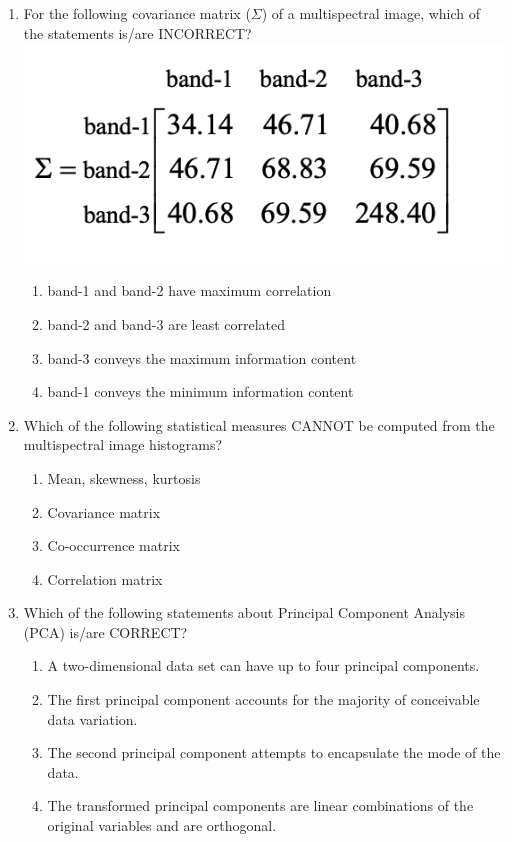 \documentclass[12pt]{article}
\begin{document}
\begin{enumerate}
\item For the following covariance matrix ($\Sigma$) of a multispectral image, which of the
statements is/are INCORRECT?\\

\includegraphics[scale=1]{Figs/LatexImage10.png} \\

\begin{enumerate}
   \item band-1 and band-2 have maximum correlation 
   \item band-2 and band-3 are least correlated 
   \item band-3 conveys the maximum information content 
   \item band-1 conveys the minimum information content 
\end{enumerate}

\item Which of the following statistical measures CANNOT be computed from the
multispectral image histograms?

\begin{enumerate}
    \item Mean, skewness, kurtosis 
   \item Covariance matrix 
   \item Co-occurrence matrix 
   \item Correlation matrix 
\end{enumerate}

\item Which of the following statements about Principal Component Analysis (PCA)
is/are CORRECT?

\begin{enumerate}
     \item A two-dimensional data set can have up to four principal components. 
   \item The first principal component accounts for the majority of conceivable data
variation. 
   \item The second principal component attempts to encapsulate the mode of the data. 
   \item The transformed principal components are linear combinations of the original
variables and are orthogonal.
\end{enumerate}


\end{enumerate}
\end{document}
